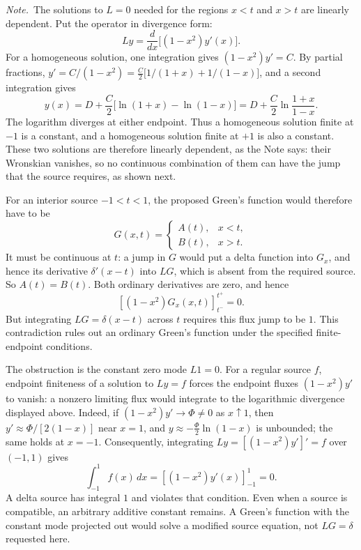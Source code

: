 \emph{Note.}~The solutions to $L=0$ needed for the regions $x<t$ and $x>t$ are
linearly dependent.
\solution
Put the operator in divergence form:
\[
Ly=\frac d{dx}\bigl[(1-x^2)y'(x)\bigr].
\]
For a homogeneous solution, one integration gives
$(1-x^2)y'=C$. By partial fractions,
$y'=C/(1-x^2)=\frac C2\bigl[1/(1+x)+1/(1-x)\bigr]$, and a second
integration gives
\[
y(x)=D+\frac C2\bigl[\ln(1+x)-\ln(1-x)\bigr]
=D+\frac C2\ln\frac{1+x}{1-x}.
\]
The logarithm diverges at either endpoint. Thus a homogeneous solution
finite at $-1$ is a constant, and a homogeneous solution finite at $+1$
is also a constant. These two solutions are therefore linearly
dependent, as the Note says: their Wronskian vanishes, so no continuous
combination of them can have the jump that the source requires, as
shown next.

For an interior source $-1<t<1$, the proposed Green's function would
therefore have to be
\[
G(x,t)=\begin{cases}A(t),&x<t,\\B(t),&x>t.\end{cases}
\]
It must be continuous at $t$: a jump in $G$ would put a delta function
into $G_x$, and hence its derivative $\delta'(x-t)$ into $LG$, which is
absent from the required source.
So $A(t)=B(t)$. Both ordinary derivatives are zero, and hence
\[
\left[(1-x^2)G_x(x,t)\right]_{t^-}^{t^+}=0.
\]
But integrating $LG=\delta(x-t)$ across $t$ requires this flux jump
to be $1$. This contradiction rules out an ordinary Green's function
under the specified finite-endpoint conditions.

The obstruction is the constant zero mode $L1=0$. For a regular source
$f$, endpoint finiteness of a solution to $Ly=f$ forces the endpoint
fluxes $(1-x^2)y'$ to vanish: a nonzero limiting flux would integrate
to the logarithmic divergence displayed above. Indeed, if
$(1-x^2)y'\to\Phi\ne0$ as $x\uparrow1$, then
$y'\approx\Phi/[2(1-x)]$ near $x=1$, and $y\approx-\frac\Phi2\ln(1-x)$
is unbounded; the same holds at $x=-1$. Consequently, integrating
$Ly=[(1-x^2)y']'=f$ over $(-1,1)$ gives
\[
\int_{-1}^1f(x)\,dx
=\left[(1-x^2)y'(x)\right]_{-1}^1=0.
\]
A delta source has integral $1$ and violates that condition. Even when
a source is compatible, an arbitrary additive constant remains.
A Green's function with the constant mode projected out would solve a
modified source equation, not $LG=\delta$ requested here.

